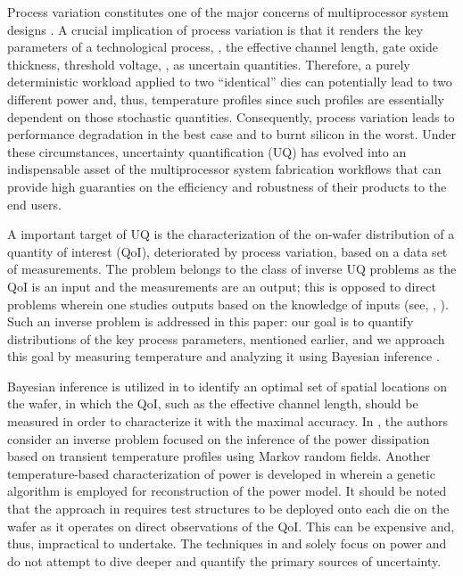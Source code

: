 Process variation constitutes one of the major concerns of multiprocessor system designs \cite{srivastava2010}. A crucial implication of process variation is that it renders the key parameters of a technological process, \eg, the effective channel length, gate oxide thickness, threshold voltage, \etc, as uncertain quantities.
Therefore, a purely deterministic workload applied to two ``identical'' dies can potentially lead to two different power and, thus, temperature profiles since such profiles are essentially dependent on those stochastic quantities. Consequently, process variation leads to performance degradation in the best case and to burnt silicon in the worst.
Under these circumstances, uncertainty quantification (UQ) has evolved into an indispensable asset of the multiprocessor system fabrication workflows that can provide high guaranties on the efficiency and robustness of their products to the end users.

A important target of UQ is the characterization of the on-wafer distribution of a quantity of interest (QoI), deteriorated by process variation, based on a data set of measurements. The problem belongs to the class of inverse UQ problems as the QoI is an input and the measurements are an output; this is opposed to direct problems wherein one studies outputs based on the knowledge of inputs (see, \eg, \cite{juan2011, juan2012}).
Such an inverse problem is addressed in this paper: our goal is to quantify distributions of the key process parameters, mentioned earlier, and we approach this goal by measuring temperature and analyzing it using Bayesian inference \cite{gelman2004}.

Bayesian inference is utilized in \cite{zhang2010} to identify an optimal set of spatial locations on the wafer, in which the QoI, such as the effective channel length, should be measured in order to characterize it with the maximal accuracy.
In \cite{paek2012}, the authors consider an inverse problem focused on the inference of the power dissipation based on transient temperature profiles using Markov random fields.
Another temperature-based characterization of power is developed in \cite{mesa-martinez2007} wherein a genetic algorithm is employed for reconstruction of the power model.
It should be noted that the approach in \cite{zhang2010} requires test structures to be deployed onto each die on the wafer as it operates on direct observations of the QoI. This can be expensive and, thus, impractical to undertake. The techniques in \cite{paek2012} and \cite{mesa-martinez2007} solely focus on power and do not attempt to dive deeper and quantify the primary sources of uncertainty.

